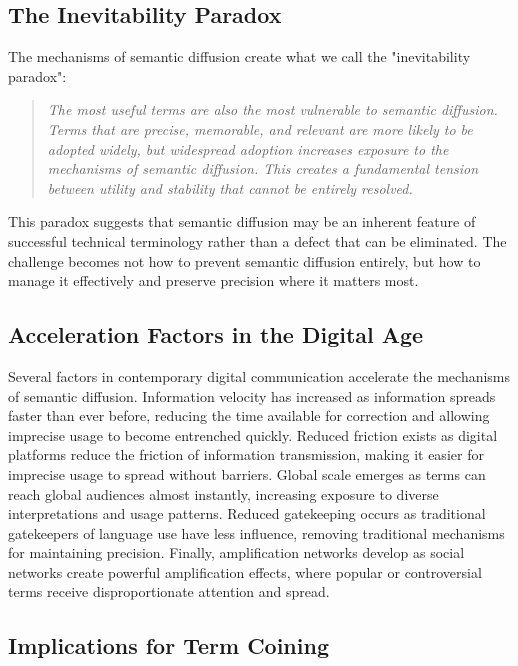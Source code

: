 \documentclass[11pt]{article}
\begin{document}
\subsection{The Inevitability Paradox}

The mechanisms of semantic diffusion create what we call the "inevitability paradox":

\begin{quote}
\emph{The most useful terms are also the most vulnerable to semantic diffusion. Terms that are precise, memorable, and relevant are more likely to be adopted widely, but widespread adoption increases exposure to the mechanisms of semantic diffusion. This creates a fundamental tension between utility and stability that cannot be entirely resolved.}
\end{quote}

This paradox suggests that semantic diffusion may be an inherent feature of successful technical terminology rather than a defect that can be eliminated. The challenge becomes not how to prevent semantic diffusion entirely, but how to manage it effectively and preserve precision where it matters most.

\subsection{Acceleration Factors in the Digital Age}

Several factors in contemporary digital communication accelerate the mechanisms of semantic diffusion. Information velocity has increased as information spreads faster than ever before, reducing the time available for correction and allowing imprecise usage to become entrenched quickly. Reduced friction exists as digital platforms reduce the friction of information transmission, making it easier for imprecise usage to spread without barriers. Global scale emerges as terms can reach global audiences almost instantly, increasing exposure to diverse interpretations and usage patterns. Reduced gatekeeping occurs as traditional gatekeepers of language use have less influence, removing traditional mechanisms for maintaining precision. Finally, amplification networks develop as social networks create powerful amplification effects, where popular or controversial terms receive disproportionate attention and spread.

\subsection{Implications for Term Coining}
\end{document}
